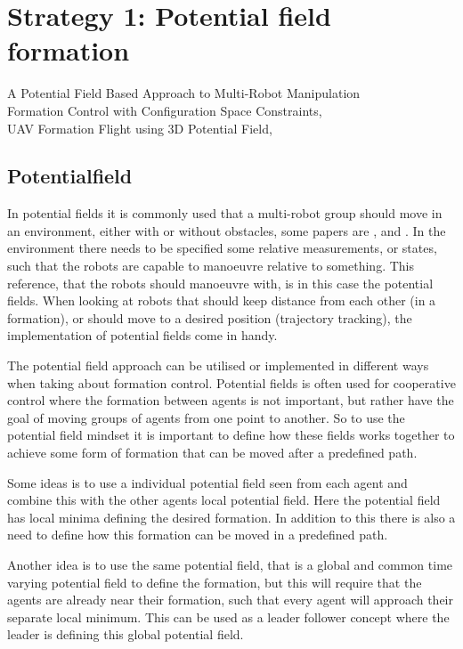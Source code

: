 \section{Strategy 1: Potential field formation}
\label{sc:potential-fields}
A Potential Field Based Approach to Multi-Robot Manipulation \citep{pfmrm}\\
Formation Control with Configuration Space Constraints, \citep{fccsc}\\
UAV Formation Flight using 3D Potential Field, \citep{UAVff3dpf}\\


\subsection{Potentialfield}
In potential fields it is commonly used that a multi-robot group should move in an environment, either with or without obstacles, some papers are \citep{pfmrm}, \citep{fccsc} and \citep{UAVff3dpf}. In the environment there needs to be specified some relative measurements, or states, such that the robots are capable to manoeuvre relative to something. This reference, that the robots should manoeuvre with, is in this case the potential fields. When looking at robots that should keep distance from each other (in a formation), or should move to a desired position (trajectory tracking), the implementation of potential fields come in handy.

The potential field approach can be utilised or implemented in
different ways when taking about formation control. Potential fields
is often used for cooperative control where the formation between
agents is not important, but rather have the goal of moving groups of
agents from one point to another.  So to
use the potential field mindset it is important to define how these
fields works together to achieve some form of formation that can be
moved after a predefined path. 

Some ideas is to use a individual potential field seen from each
agent and combine this with the other agents local potential field.
Here the potential field has local minima defining the desired
formation. In addition to this there is also a need to define how this
formation can be moved in a predefined path.

Another idea is to use the same potential field, that is a global and
common time varying potential field to define the formation, but this
will require that the agents are already near their formation, such
that every agent will approach their separate local minimum. This can
be used as a leader follower concept where the leader is defining this
global potential field.

